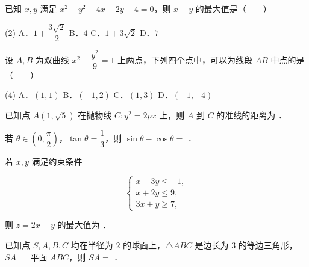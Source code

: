 \begin{question}
已知 $x,y$ 满足 $x^2+y^2-4x-2y-4=0$，则 $x-y$ 的最大值是\mbox{（　　）}

\begin{gkopts}(2)
\task A．$1+\dfrac{3\sqrt2}{2}$
\task B．$4$
\task C．$1+3\sqrt2$
\task D．$7$
\end{gkopts}

\end{question}
\begin{question}
设 $A,B$ 为双曲线 $x^2-\dfrac{y^2}{9}=1$ 上两点，下列四个点中，可以为线段 $AB$ 中点的是\mbox{（　　）}

\begin{gkopts}(4)
\task A．$(1,1)$
\task B．$(-1,2)$
\task C．$(1,3)$
\task D．$(-1,-4)$
\end{gkopts}

\end{question}

\begin{question}
已知点 $A(1,\sqrt5)$ 在抛物线 $C:y^2=2px$ 上，则 $A$ 到 $C$ 的准线的距离为 \gkblank{}．

\end{question}
\begin{question}
若 $\theta\in\left(0,\dfrac\pi2\right)$，$\tan\theta=\dfrac13$，则 $\sin\theta-\cos\theta=$ \gkblank{}．

\end{question}
\begin{question}
若 $x,y$ 满足约束条件

\nopagebreak[4]
\[
\begin{cases}
x-3y\leqslant-1,\\
x+2y\leqslant9,\\
3x+y\geqslant7,
\end{cases}
\]

则 $z=2x-y$ 的最大值为 \gkblank{}．

\end{question}
\begin{question}
已知点 $S,A,B,C$ 均在半径为 $2$ 的球面上，$\triangle ABC$ 是边长为 $3$ 的等边三角形，$SA\perp$ 平面 $ABC$，则 $SA=$ \gkblank{}．

\end{question}

